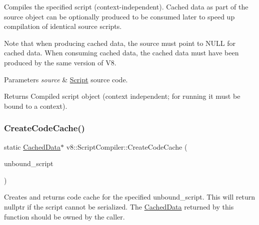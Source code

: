 Compiles the specified script (context-\/independent). Cached data as part of the source object can be optionally produced to be consumed later to speed up compilation of identical source scripts.

Note that when producing cached data, the source must point to N\+U\+LL for cached data. When consuming cached data, the cached data must have been produced by the same version of V8.


\begin{DoxyParams}{Parameters}
{\em source} & \mbox{\hyperlink{classv8_1_1Script}{Script}} source code. \\
\hline
\end{DoxyParams}
\begin{DoxyReturn}{Returns}
Compiled script object (context independent; for running it must be bound to a context). 
\end{DoxyReturn}
\mbox{\label{classv8_1_1ScriptCompiler_a3083edf7f887a38f1024d11c0dd7ccdb}} 
\subsubsection{\texorpdfstring{Create\+Code\+Cache()}{CreateCodeCache()}\hspace{0.1cm}{\footnotesize\ttfamily [1/2]}}
{\footnotesize\ttfamily static \mbox{\hyperlink{structv8_1_1ScriptCompiler_1_1CachedData}{Cached\+Data}}$\ast$ v8\+::\+Script\+Compiler\+::\+Create\+Code\+Cache (\begin{DoxyParamCaption}\item[{\mbox{\hyperlink{classv8_1_1Local}{Local}}$<$ \mbox{\hyperlink{classv8_1_1UnboundScript}{Unbound\+Script}} $>$}]{unbound\+\_\+script }\end{DoxyParamCaption})\hspace{0.3cm}{\ttfamily [static]}}

Creates and returns code cache for the specified unbound\+\_\+script. This will return nullptr if the script cannot be serialized. The \mbox{\hyperlink{structv8_1_1ScriptCompiler_1_1CachedData}{Cached\+Data}} returned by this function should be owned by the caller. \mbox{\label{classv8_1_1ScriptCompiler_af62a9c3e10c17aec5a99f48bff05f23e}} 
